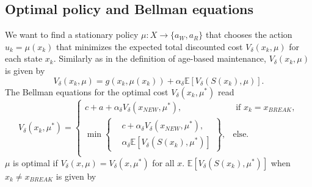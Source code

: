 \subsection{Optimal policy and Bellman equations}
We want to find a stationary policy $\mu:X\rightarrow \{a_W,a_R\}$ that chooses the action $u_k=\mu(x_k)$ that minimizes the expected total discounted cost $V_\delta(x_k,\mu)$ for each state $x_k$.
Similarly as in the definition of age-based maintenance, $V_\delta(x_k,\mu)$ is given by
\[V_\delta(x_k,\mu)=g(x_k,\mu(x_k))+\alpha_\delta \mathbb{E}[V_\delta(S(x_k),\mu)].\]
The Bellman equations for the optimal cost $V_\delta(x_k,\mu^*)$ read
\begin{equation}\label{eq:MmfmBellman}
V_\delta(x_k,\mu^*)=\begin{cases}
c+a+\alpha_\delta V_\delta(x_{NEW},\mu^*),&\text{ if }x_k=x_{BREAK},\\
\min\left\{\begin{split}&c+\alpha_\delta V_\delta(x_{NEW},\mu^*),\\&\alpha_\delta \mathbb{E}[V_\delta(S(x_k),\mu^*)]\end{split}\right\},&\text{else.}\\
\end{cases}
\end{equation}
$\mu$ is optimal if $V_\delta(x,\mu)=V_\delta(x,\mu^*)$ for all $x$.
$\mathbb{E}[V_\delta(S(x_k),\mu^*)]$ when $x_k\neq x_{BREAK}$ is given by 
